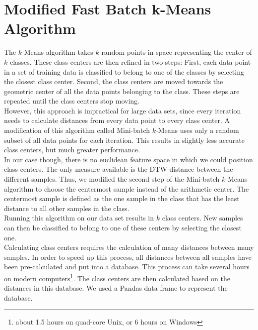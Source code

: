 \section{Modified Fast Batch k-Means Algorithm}
\label{sec:TheoryKMeans}

The $k$-Means algorithm takes $k$ random points in space representing the center of $k$ classes. These class centers are then refined in two steps: First, each data point in a set of training data is classified to belong to one of the classes by selecting the closest class center. Second, the class centers are moved towards the geometric center of all the data points belonging to the class. These steps are repeated until the class centers stop moving.\\
However, this approach is impractical for large data sets, since every iteration needs to calculate distances from every data point to every class center. A modification of this algorithm called Mini-batch $k$-Means \cite{bib:Elkan2003} uses only a random subset of all data points for each iteration. This results in slightly less accurate class centers, but much greater performance.\\
In our case though, there is no euclidean feature space in which we could position class centers. The only measure available is the DTW-distance between the different samples. Thus, we modified the second step of the Mini-batch $k$-Means algorithm to choose the centermost sample instead of the arithmetic center. The centermost sample is defined as the one sample in the class that has the least distance to all other samples in the class.\\
Running this algorithm on our data set results in $k$ class centers. New samples can then be classified to belong to one of these centers by selecting the closest one.\\
Calculating class centers requires the calculation of many distances between many samples. In order to speed up this process, all distances between all samples have been pre-calculated and put into a database. This process can take several hours on modern computers\footnote{about 1.5 hours on quad-core Unix, or 6 hours on Windows}. The class centers are then calculated based on the distances in this database. We used a Pandas data frame to represent the database.
